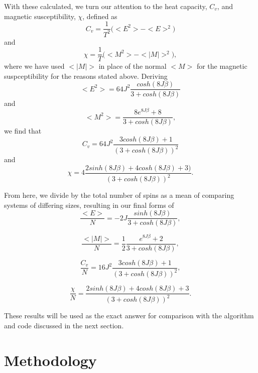 \documentclass[11pt,a4paper]{article}
\begin{document}
With these calculated, we turn our attention to the heat capacity, $C_v$, and magnetic susceptibility, $\chi$, defined as
\begin{equation}
C_v = \frac{1}{T^2}\bigg(<E^2> - <E>^2\bigg)
\end{equation}
and
\begin{equation}
\chi = \frac{1}{T}\bigg(<M^2> - <|M|>^2\bigg),
\end{equation}
where we have used $<|M|>$ in place of the normal $<M>$ for the magnetic suspceptibility for the reasons stated above. Deriving 
\begin{equation}
<E^2> = 64J^2\frac{cosh(8J\beta)}{3+cosh(8J\beta)}
\end{equation}
and
\begin{equation}
<M^2> = \frac{8e^{8J\beta} + 8}{3 + cosh(8J\beta)},
\end{equation}
we find that
\begin{equation}
C_v = 64J^2\frac{3cosh(8J\beta) + 1}{(3 + cosh(8J\beta))^2}
\end{equation}
and
\begin{equation}
\chi = 4\frac{2sinh(8J\beta) + 4cosh(8J\beta) + 3)}{(3 + cosh(8J\beta))^2}.
\end{equation}

From here, we divide by the total number of spins as a mean of comparing systems of differing sizes, resulting in our final forms of
\begin{equation}
\frac{<E>}{N} = -2J\frac{sinh(8J\beta)}{3 + cosh(8J\beta)},
\end{equation}

\begin{equation}
\frac{<|M|>}{N} = \frac{1}{2}\frac{e^{8J\beta} + 2}{3+cosh(8J\beta)},
\end{equation}

\begin{equation}
\frac{C_v}{N} = 16J^2\frac{3cosh(8J\beta) + 1}{(3 + cosh(8J\beta))^2},
\end{equation}

\begin{equation}
\frac{\chi}{N} = \frac{2sinh(8J\beta) + 4cosh(8J\beta) + 3}{(3 + cosh(8J\beta))^2}.
\end{equation}

These results will be used as the exact answer for comparison with the algorithm and code discussed in the next section.

\section{Methodology}
\end{document}
